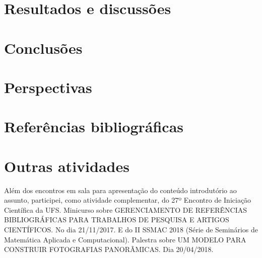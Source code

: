 \documentclass[12pt, a4paper]{article}
\begin{document}
\section{Resultados e discussões }
\section{Conclusões}
\section{Perspectivas}

\newpage

\section{Referências bibliográficas}

	
\newpage

\section{Outras atividades}
Além dos encontros em sala para apresentação do conteúdo introdutório ao assunto,
participei, como atividade complementar, do 27º Encontro de Iniciação Científica da UFS.
Minicurso sobre GERENCIAMENTO DE REFERÊNCIAS BIBLIOGRÁFICAS PARA
TRABALHOS DE PESQUISA E ARTIGOS CIENTÍFICOS. No dia 21/11/2017. E do II SSMAC 2018 (Série de Seminários de Matemática Aplicada e Computacional). Palestra sobre UM MODELO PARA CONSTRUIR FOTOGRAFIAS PANORÂMICAS. Dia 20/04/2018.\
\end{document}
